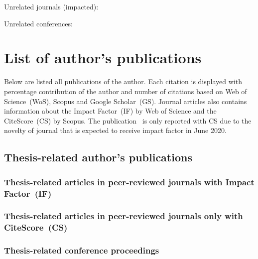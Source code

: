 \documentclass[a4paper,11pt,titlepage,twoside]{book}
\newcommand{\conditionalClearPage}{
  \ifdefined\printversion
  \clearemptydoublepage
  \else
  \newpage{}
  \clearpage
\fi
}
\begin{document}
Unrelated journals (impacted):
\cite{baca2016vzlusat}
\cite{baca2018vzlusat}
\cite{daniel2019inorbit}
\cite{urban2017vzlusat}

Unrelated conferences:
\cite{daniel2016terrestrial}
\cite{daniel2017xray}



\conditionalClearPage
\printbibliography[notkeyword=mine]
\conditionalClearPage



\appendix
\renewcommand\chaptername{Appendix}

\chapter{List of author's publications}

Below are listed all publications of the author.
Each citation is displayed with percentage contribution of the author and number of citations based on Web of Science~(WoS), Scopus and Google Scholar~(GS).
Journal articles also contains information about the Impact Factor~(IF) by Web of Science and the CiteScore~(CS) by Scopus.
The publication~\cite{Loianno_RAL_desert} is only reported with CS due to the novelty of journal that is expected to receive impact factor in June 2020.

\section{Thesis-related author's publications}

\subsection*{Thesis-related articles in peer-reviewed journals with Impact Factor~(IF)}
\nocite{}
\printbibliography[keyword={mine},keyword={phd_related},keyword={journal},keyword={if},heading=none,title={}]

\subsection*{Thesis-related articles in peer-reviewed journals only with CiteScore~(CS)}
\nocite{}
\printbibliography[keyword={mine},keyword={phd_related},keyword={journal},keyword={cs},heading=none,title={}]

\subsection*{Thesis-related conference proceedings}
\nocite{}
\printbibliography[keyword={mine},keyword={phd_related},keyword={conference},heading=none,title={}]
\end{document}
